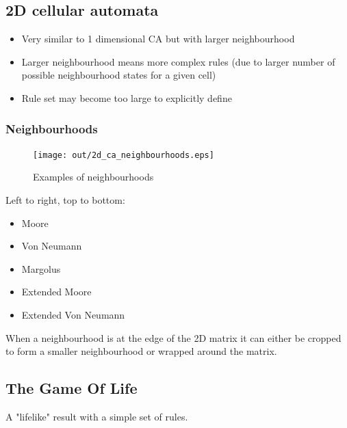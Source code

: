 \documentclass[a4paper]{article}
\begin{document}
\subsection{2D cellular automata}

\begin{itemize}
  \item Very similar to 1 dimensional CA but with larger neighbourhood
  \item Larger neighbourhood means more complex rules (due to larger number of
        possible neighbourhood states for a given cell)
  \item Rule set may become too large to explicitly define
\end{itemize}

\subsubsection{Neighbourhoods}

\begin{figure}[h!]
  \centering
  \texttt{[image: out/2d\_ca\_neighbourhoods.eps]}
  \caption{Examples of neighbourhoods}
  \label{fig:2d_ca_neighbourhoods}
\end{figure}
\FloatBarrier

Left to right, top to bottom:

\begin{itemize}
  \item Moore
  \item Von Neumann
  \item Margolus
  \item Extended Moore
  \item Extended Von Neumann
\end{itemize}

When a neighbourhood is at the edge of the 2D matrix it can either be cropped to
form a smaller neighbourhood or wrapped around the matrix.

\subsection{The Game Of Life}


A "lifelike" result with a simple set of rules.
\end{document}
